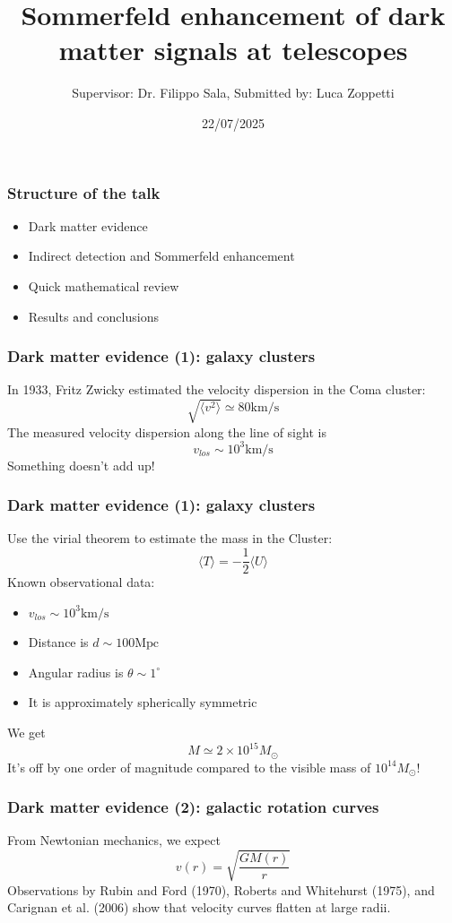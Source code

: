 \documentclass{beamer}
\title{Sommerfeld enhancement of dark matter signals at telescopes}
\author{Supervisor: Dr. Filippo Sala, Submitted by: Luca Zoppetti}
\institute{Alma Mater Studiorum - University of Bologna}
\date{22/07/2025}
\begin{document}
\frame{\titlepage}

\begin{frame}
\frametitle{Structure of the talk}
\pause
\begin{itemize}
	\item Dark matter evidence
	\item Indirect detection and Sommerfeld enhancement
	\item Quick mathematical review
	\item Results and conclusions
\end{itemize}
\end{frame}

\begin{frame}
\frametitle{Dark matter evidence (1): galaxy clusters}
In 1933, Fritz Zwicky estimated the velocity dispersion in the Coma cluster:
\[
	\sqrt{\langle v^2 \rangle } \simeq 80 \mathrm{km / s}
\]
\pause
The measured velocity dispersion along the line of sight is
\[
	v_{los} \sim 10^3 \mathrm{km / s} 
\]
\pause
Something doesn't add up!
\end{frame}

\begin{frame}
\frametitle{Dark matter evidence (1): galaxy clusters}
Use the virial theorem to estimate the mass in the Cluster:
\[
	\langle T \rangle = - \frac{1}{2} \langle U \rangle 
\]
\pause
Known observational data:
\begin{itemize}
	\item \(v_{los} \sim 10^3 \mathrm{km / s} \)
	\item Distance is \(d \sim 100 \mathrm{Mpc} \)
	\item Angular radius is \(\theta \sim 1^{\circ } \)
	\item It is approximately spherically symmetric
\end{itemize}
\pause
We get
\[
	M \simeq 2 \times 10^{15} M_\odot
\]
\pause
It's off by one order of magnitude compared to the visible mass of \(10^{14} M_\odot\)!
\end{frame}

\begin{frame}
\frametitle{Dark matter evidence (2): galactic rotation curves}
From Newtonian mechanics, we expect
\[
	v(r) = \sqrt{\frac{GM(r)}{r}} 
\]
\pause
Observations by Rubin and Ford (1970), Roberts and Whitehurst (1975), and Carignan et al. (2006) show that velocity curves flatten at large radii.
\end{frame}
\end{document}
